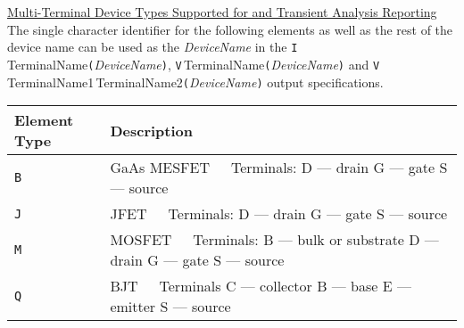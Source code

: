 \noindent
\underline{Multi-Terminal Device Types Supported for \dc and Transient Analysis
Reporting}\\[0.1in]
The single character identifier for the following elements as well as the rest
of the device name can be used as the {\it DeviceName}
in the
{\tt I}{$\,$TerminalName}{\tt (}{\it DeviceName}{\tt )},
{\tt V}{$\,$TerminalName}{\tt (}{\it DeviceName}{\tt )} and\newline
{\tt V}{$\,$TerminalName1$\,$TerminalName2}{\tt (}{\it DeviceName}{\tt )}
output specifications.\\[0.1in]
\hspace*{\fill}
\begin{tabular}{|p{1in}|p{3in}|}
\hline
Element Type & Description\\
\hline
{\tt B} & GaAs MESFET\ \ \ Terminals:\newline
\hspace*{1in}D --- drain\newline
\hspace*{1in}G --- gate\newline
\hspace*{1in}S --- source\\
{\tt J} & JFET\ \ \ Terminals:\newline
\hspace*{1in}D --- drain\newline
\hspace*{1in}G --- gate\newline
\hspace*{1in}S --- source\\
{\tt M} & MOSFET\ \ \ Terminals:\newline
\hspace*{1in}B --- bulk or substrate\newline
\hspace*{1in}D --- drain\newline
\hspace*{1in}G --- gate\newline
\hspace*{1in}S --- source\\
{\tt Q} & BJT\ \ \ Terminals\newline
\hspace*{1in}C --- collector\newline
\hspace*{1in}B --- base\newline
\hspace*{1in}E --- emitter\newline
\hspace*{1in}S --- source\\
\hline
\end{tabular}\\[0.1in]

